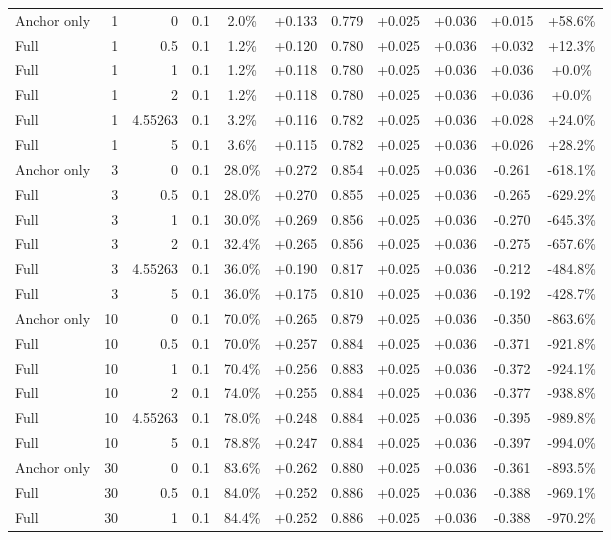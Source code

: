 \begin{table}[htbp]
\begin{tabular}{lrrrccccccc}
Anchor only & 1 & 0 & 0.1 & 2.0\% & +0.133 & 0.779 & +0.025 & +0.036 & +0.015 & +58.6\% \\
Full & 1 & 0.5 & 0.1 & 1.2\% & +0.120 & 0.780 & +0.025 & +0.036 & +0.032 & +12.3\% \\
Full & 1 & 1 & 0.1 & 1.2\% & +0.118 & 0.780 & +0.025 & +0.036 & +0.036 & +0.0\% \\
Full & 1 & 2 & 0.1 & 1.2\% & +0.118 & 0.780 & +0.025 & +0.036 & +0.036 & +0.0\% \\
Full & 1 & 4.55263 & 0.1 & 3.2\% & +0.116 & 0.782 & +0.025 & +0.036 & +0.028 & +24.0\% \\
Full & 1 & 5 & 0.1 & 3.6\% & +0.115 & 0.782 & +0.025 & +0.036 & +0.026 & +28.2\% \\
Anchor only & 3 & 0 & 0.1 & 28.0\% & +0.272 & 0.854 & +0.025 & +0.036 & -0.261 & -618.1\% \\
Full & 3 & 0.5 & 0.1 & 28.0\% & +0.270 & 0.855 & +0.025 & +0.036 & -0.265 & -629.2\% \\
Full & 3 & 1 & 0.1 & 30.0\% & +0.269 & 0.856 & +0.025 & +0.036 & -0.270 & -645.3\% \\
Full & 3 & 2 & 0.1 & 32.4\% & +0.265 & 0.856 & +0.025 & +0.036 & -0.275 & -657.6\% \\
Full & 3 & 4.55263 & 0.1 & 36.0\% & +0.190 & 0.817 & +0.025 & +0.036 & -0.212 & -484.8\% \\
Full & 3 & 5 & 0.1 & 36.0\% & +0.175 & 0.810 & +0.025 & +0.036 & -0.192 & -428.7\% \\
Anchor only & 10 & 0 & 0.1 & 70.0\% & +0.265 & 0.879 & +0.025 & +0.036 & -0.350 & -863.6\% \\
Full & 10 & 0.5 & 0.1 & 70.0\% & +0.257 & 0.884 & +0.025 & +0.036 & -0.371 & -921.8\% \\
Full & 10 & 1 & 0.1 & 70.4\% & +0.256 & 0.883 & +0.025 & +0.036 & -0.372 & -924.1\% \\
Full & 10 & 2 & 0.1 & 74.0\% & +0.255 & 0.884 & +0.025 & +0.036 & -0.377 & -938.8\% \\
Full & 10 & 4.55263 & 0.1 & 78.0\% & +0.248 & 0.884 & +0.025 & +0.036 & -0.395 & -989.8\% \\
Full & 10 & 5 & 0.1 & 78.8\% & +0.247 & 0.884 & +0.025 & +0.036 & -0.397 & -994.0\% \\
Anchor only & 30 & 0 & 0.1 & 83.6\% & +0.262 & 0.880 & +0.025 & +0.036 & -0.361 & -893.5\% \\
Full & 30 & 0.5 & 0.1 & 84.0\% & +0.252 & 0.886 & +0.025 & +0.036 & -0.388 & -969.1\% \\
Full & 30 & 1 & 0.1 & 84.4\% & +0.252 & 0.886 & +0.025 & +0.036 & -0.388 & -970.2\% \\

\end{tabular}
\end{table}
